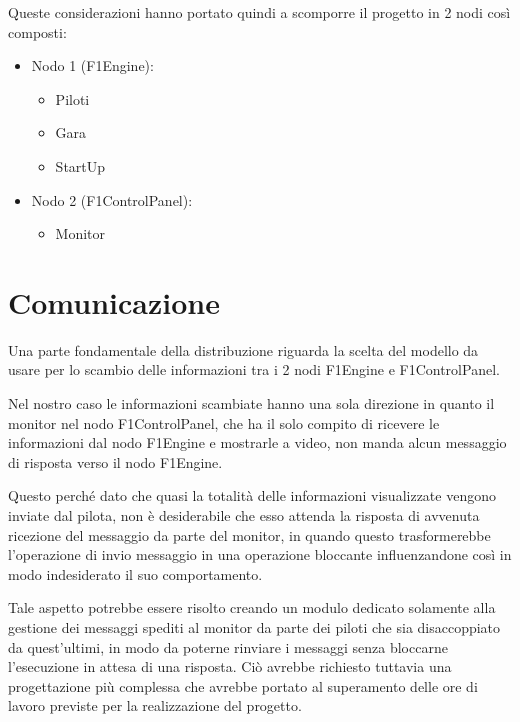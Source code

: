 \documentclass[a4paper,11pt, twoside, openright]{book}
\begin{document}
      Queste considerazioni hanno portato quindi a scomporre il progetto in 2 nodi così composti:
      
      \begin{itemize}
	\item Nodo 1 (F1Engine):
	\begin{itemize}
	  \item Piloti
	  \item Gara
	  \item StartUp
	\end{itemize}
	\item Nodo 2 (F1ControlPanel):
	\begin{itemize}
	  \item Monitor
	\end{itemize}
      \end{itemize}
          
    \section{Comunicazione}
    \label{Comunicazione}
      Una parte fondamentale della distribuzione riguarda la scelta del modello da usare per lo
      scambio delle informazioni tra i 2 nodi
      F1Engine e F1ControlPanel.
      
      Nel nostro caso le informazioni scambiate hanno una sola direzione in quanto il monitor nel nodo F1ControlPanel, 
      che ha il solo compito di
      ricevere le informazioni dal nodo F1Engine e mostrarle a video, non manda alcun messaggio
      di risposta verso il nodo F1Engine.
      
      Questo perché dato che quasi la totalità delle informazioni visualizzate
      vengono inviate dal pilota, non è desiderabile che esso
      attenda la risposta di avvenuta ricezione del messaggio da parte del monitor,
      in quando questo trasformerebbe l'operazione di invio messaggio in una operazione bloccante influenzandone così
      in modo indesiderato il suo comportamento.
      
      Tale aspetto potrebbe essere risolto creando un modulo dedicato solamente alla gestione dei messaggi spediti al monitor
      da parte dei piloti che sia disaccoppiato da quest'ultimi, in modo da poterne rinviare i messaggi senza 
      bloccarne l'esecuzione in attesa di una risposta.
      Ciò avrebbe richiesto tuttavia una progettazione più complessa che avrebbe portato al superamento delle ore di lavoro
      previste per la realizzazione del progetto.
      
\end{document}
